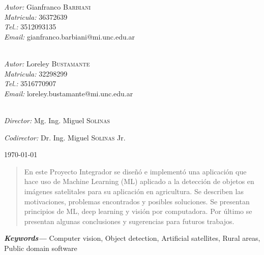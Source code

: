 \documentclass[runningheads]{llncs}
\providecommand{\keywords}[1]
{
  \small	
  \textbf{\textit{Keywords---}} #1
}
\begin{document}
\begin{titlepage}
\begin{center}
\begin{minipage}{0.49\textwidth}
\begin{flushleft} \large
\emph{Autor: }{Gianfranco \textsc{Barbiani}}\\
\emph{Matricula: }{36372639}\\
\emph{Tel.: }{3512093135}\\
\emph{Email: }{gianfranco.barbiani@mi.unc.edu.ar}\\~\\
\end{flushleft}
\end{minipage}
\begin{minipage}{0.49\textwidth}
\begin{flushleft} \large
\emph{Autor: }{Loreley \textsc{Bustamante}}\\
\emph{Matricula: }{32298299}\\
\emph{Tel.: }{3516770907}\\
\emph{Email: }{loreley.bustamante@mi.unc.edu.ar}\\~\\
\end{flushleft}
\end{minipage}

\begin{minipage}{0.49\textwidth}
\begin{flushleft} \large
\emph{Director: }{Mg. Ing. Miguel \textsc{Solinas}}\\
\end{flushleft}
\end{minipage}
\begin{minipage}{0.49\textwidth}
\begin{flushleft} \large
\emph{Codirector: }{Dr. Ing. Miguel \textsc{Solinas} Jr.}\\
\end{flushleft}
\end{minipage}

\vspace*{\fill}
{\large \today}\\ %
\end{center}
\end{titlepage}
\clearpage %
\pagebreak

\begin{abstract}
En este Proyecto Integrador se diseñó e implementó una aplicación que hace uso de Machine Learning (ML) aplicado a la detección de objetos en imágenes satelitales para su aplicación en agricultura. Se describen las motivaciones, problemas encontrados y posibles soluciones. Se presentan principios de ML, deep learning y visión por computadora. Por último se presentan algunas conclusiones y sugerencias para futuros trabajos.
\end{abstract} \hspace{10pt}
\keywords{Computer vision, Object detection, Artificial satellites, Rural areas, Public domain software}
\newpage
\end{document}
